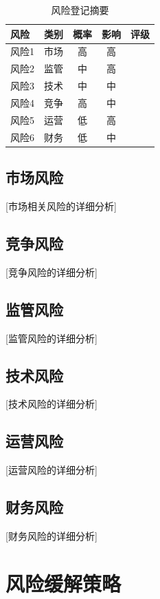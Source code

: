 \documentclass[11pt,letterpaper]{report}
\begin{document}
{\begin{table}[htbp]
\centering
\caption{风险登记摘要}
\begin{tabular}{@{}llccl@{}}
\toprule
\textbf{风险} & \textbf{类别} & \textbf{概率} & \textbf{影响} & \textbf{评级} \\
\midrule
风险1 & 市场 & 高 & 高 & \riskhigh{} \\
\rowcolor{tablealt} 风险2 & 监管 & 中 & 高 & \riskhigh{} \\
风险3 & 技术 & 中 & 中 & \riskmedium{} \\
\rowcolor{tablealt} 风险4 & 竞争 & 高 & 中 & \riskmedium{} \\
风险5 & 运营 & 低 & 高 & \riskmedium{} \\
\rowcolor{tablealt} 风险6 & 财务 & 低 & 中 & \risklow{} \\
\bottomrule
\end{tabular}
\label{tab:risk_register}
\end{table}

\subsection{市场风险}
[市场相关风险的详细分析]

\subsection{竞争风险}
[竞争风险的详细分析]

\subsection{监管风险}
[监管风险的详细分析]

\subsection{技术风险}
[技术风险的详细分析]

\subsection{运营风险}
[运营风险的详细分析]

\subsection{财务风险}
[财务风险的详细分析]

\section{风险缓解策略}

}
\end{document}
